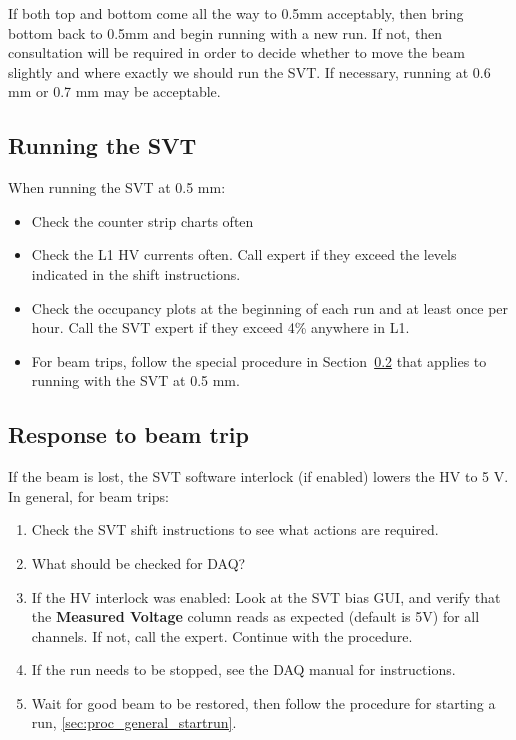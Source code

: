 \documentclass[12pt]{report}
\begin{document}
If both top and bottom come all the way to 0.5mm acceptably, then bring bottom back to 0.5mm and begin running with a new run. If not, then consultation will be required in order to decide whether to move the beam slightly and where exactly we should run the SVT.  If necessary, running at 0.6 mm or 0.7 mm may be acceptable.

\subsection{Running the SVT}

When running the SVT at 0.5 mm:
\begin{itemize}
\item Check the counter strip charts often
\item Check the L1 HV currents often.  Call expert if they exceed the levels indicated in the shift instructions.
\item Check the occupancy plots at the beginning of each run and at least once per hour.  Call the SVT expert if they exceed 4\% anywhere in L1.
\item For beam trips, follow the special procedure in Section~\ref{sec:proc_general_beamtrip} that applies to running with the SVT at 0.5 mm.
\end{itemize}

\subsection{Response to beam trip}
\label{sec:proc_general_beamtrip}
If the beam is lost, the SVT software interlock (if enabled) lowers the HV to 5 V.  In general, for beam trips:
\begin{enumerate}
\item Check the SVT shift instructions to see what actions are required.
\item {\color{red} What should be checked for DAQ?}
\item If the HV interlock was enabled: Look at the SVT bias GUI, and verify that the \textbf{Measured Voltage} column reads as expected (default is 5V) for all channels. If not, call the expert. Continue with the procedure.
\item If the run needs to be stopped, see the DAQ manual for instructions.
\item Wait for good beam to be restored, then follow the procedure for starting a run, \ref{sec:proc_general_startrun}.
\end{enumerate}
\end{document}
